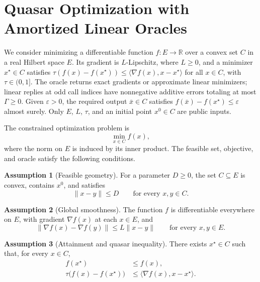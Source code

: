 \documentclass[10pt]{article}
\theoremstyle{definition}
\newtheorem{assumption}{Assumption}
\begin{document}
\section*{Quasar Optimization with Amortized Linear Oracles}
We consider minimizing a differentiable function $f:E\to\mathbb{R}$ over a convex set $C$ in a real Hilbert space $E$. Its gradient is $L$-Lipschitz, where $L\geq0$, and a minimizer $x^\star\in C$ satisfies $\tau(f(x)-f(x^\star))\leq\langle\nabla f(x),x-x^\star\rangle$ for all $x\in C$, with $\tau\in(0,1]$. The oracle returns exact gradients or approximate linear minimizers; linear replies at odd call indices have nonnegative additive errors totaling at most $\Gamma\geq0$. Given $\varepsilon>0$, the required output $\bar{x}\in C$ satisfies $f(\bar{x})-f(x^\star)\leq\varepsilon$ almost surely. Only $E$, $L$, $\tau$, and an initial point $x^0\in C$ are public inputs.

The constrained optimization problem is
\[
\min_{x\in C} f(x),
\]
where the norm on $E$ is induced by its inner product. The feasible set, objective, and oracle satisfy the following conditions.

\begin{assumption}[Feasible geometry]
For a parameter $D\geq0$, the set $C\subseteq E$ is convex, contains $x^0$, and satisfies
\[
\|x-y\|\leq D
\qquad\text{for every }x,y\in C.
\]
\end{assumption}

\begin{assumption}[Global smoothness]
The function $f$ is differentiable everywhere on $E$, with gradient $\nabla f(x)$ at each $x\in E$, and
\[
\|\nabla f(x)-\nabla f(y)\|\leq L\|x-y\|
\qquad\text{for every }x,y\in E.
\]
\end{assumption}

\begin{assumption}[Attainment and quasar inequality]
There exists $x^\star\in C$ such that, for every $x\in C$,
\[
\begin{aligned}
f(x^\star)&\leq f(x),\\
\tau\bigl(f(x)-f(x^\star)\bigr)
&\leq\langle\nabla f(x),x-x^\star\rangle.
\end{aligned}
\]
\end{assumption}
\end{document}
